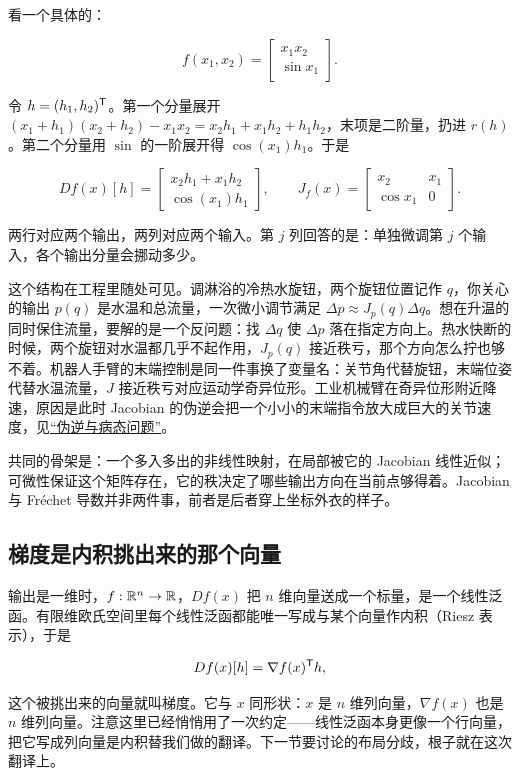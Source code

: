 看一个具体的：

\[
f(x_1,x_2)=\begin{bmatrix} x_1x_2 \\ \sin x_1 \end{bmatrix}.
\]

令 \(h=(h_1,h_2)^{\mathsf{T}}\)。第一个分量展开 \((x_1+h_1)(x_2+h_2)-x_1x_2=x_2h_1+x_1h_2+h_1h_2\)，末项是二阶量，扔进 \(r(h)\)。第二个分量用 \(\sin\) 的一阶展开得 \(\cos(x_1)h_1\)。于是

\[
Df(x)[h]=\begin{bmatrix} x_2h_1+x_1h_2 \\ \cos(x_1)h_1 \end{bmatrix},
\qquad
J_f(x)=\begin{bmatrix} x_2 & x_1 \\ \cos x_1 & 0 \end{bmatrix}.
\]

两行对应两个输出，两列对应两个输入。第 \(j\) 列回答的是：单独微调第 \(j\) 个输入，各个输出分量会挪动多少。

这个结构在工程里随处可见。调淋浴的冷热水旋钮，两个旋钮位置记作 \(q\)，你关心的输出 \(p(q)\) 是水温和总流量，一次微小调节满足 \(\Delta p\approx J_p(q)\Delta q\)。想在升温的同时保住流量，要解的是一个反问题：找 \(\Delta q\) 使 \(\Delta p\) 落在指定方向上。热水快断的时候，两个旋钮对水温都几乎不起作用，\(J_p(q)\) 接近秩亏，那个方向怎么拧也够不着。机器人手臂的末端控制是同一件事换了变量名：关节角代替旋钮，末端位姿代替水温流量，\(J\) 接近秩亏对应运动学奇异位形。工业机械臂在奇异位形附近降速，原因是此时 Jacobian 的伪逆会把一个小小的末端指令放大成巨大的关节速度，见\hyperref[sec:03-Linear-Algebra/07-SVD-and-Data-Applications/02]{``伪逆与病态问题''}。

共同的骨架是：一个多入多出的非线性映射，在局部被它的 Jacobian 线性近似；可微性保证这个矩阵存在，它的秩决定了哪些输出方向在当前点够得着。Jacobian 与 Fréchet 导数并非两件事，前者是后者穿上坐标外衣的样子。

\subsection{梯度是内积挑出来的那个向量}

输出是一维时，\(f:\mathbb{R}^n\to\mathbb{R}\)，\(Df(x)\) 把 \(n\) 维向量送成一个标量，是一个线性泛函。有限维欧氏空间里每个线性泛函都能唯一写成与某个向量作内积（Riesz 表示），于是

\[
Df(x)[h]=\nabla f(x)^{\mathsf{T}}h,
\]

这个被挑出来的向量就叫梯度。它与 \(x\) 同形状：\(x\) 是 \(n\) 维列向量，\(\nabla f(x)\) 也是 \(n\) 维列向量。注意这里已经悄悄用了一次约定——线性泛函本身更像一个行向量，把它写成列向量是内积替我们做的翻译。下一节要讨论的布局分歧，根子就在这次翻译上。

